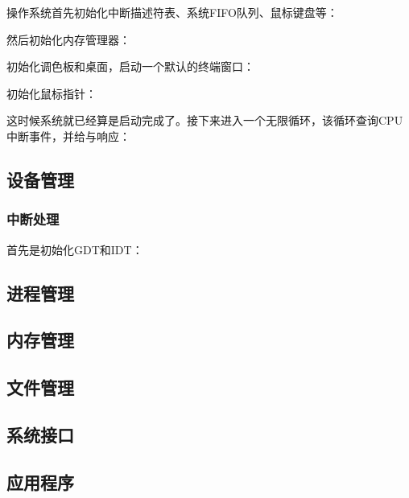 
操作系统首先初始化中断描述符表、系统FIFO队列、鼠标键盘等：
{\linespread{1}}

然后初始化内存管理器：
{\linespread{1}}

初始化调色板和桌面，启动一个默认的终端窗口：
{\linespread{1}}

初始化鼠标指针：
{\linespread{1}}

这时候系统就已经算是启动完成了。接下来进入一个无限循环，该循环查询CPU中断事件，并给与响应：
{\linespread{1}}

\subsection{设备管理}
\label{sub:设备管理}

\subsubsection{中断处理}
\label{subs:中断处理}

首先是初始化GDT和IDT：
{\linespread{1}}


\subsection{进程管理}
\label{sub:进程管理}

\subsection{内存管理}
\label{sub:内存管理}

\subsection{文件管理}
\label{sub:文件管理}

\subsection{系统接口}
\label{sub:系统接口}

\subsection{应用程序}
\label{sub:应用程序}
